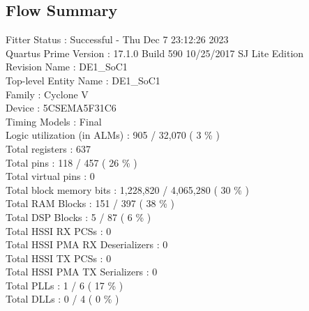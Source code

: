 \documentclass[11pt, titlepage]{article}
\begin{document}
        \subsection{Flow Summary}
            Fitter Status : Successful - Thu Dec  7 23:12:26 2023 \\
            Quartus Prime Version : 17.1.0 Build 590 10/25/2017 SJ Lite Edition \\
            Revision Name : DE1\_SoC1 \\
            Top-level Entity Name : DE1\_SoC1 \\
            Family : Cyclone V \\
            Device : 5CSEMA5F31C6 \\
            Timing Models : Final \\
            Logic utilization (in ALMs) : 905 / 32,070 ( 3 \% ) \\
            Total registers : 637 \\
            Total pins : 118 / 457 ( 26 \% ) \\
            Total virtual pins : 0 \\
            Total block memory bits : 1,228,820 / 4,065,280 ( 30 \% ) \\
            Total RAM Blocks : 151 / 397 ( 38 \% ) \\
            Total DSP Blocks : 5 / 87 ( 6 \% ) \\
            Total HSSI RX PCSs : 0 \\
            Total HSSI PMA RX Deserializers : 0 \\
            Total HSSI TX PCSs : 0 \\
            Total HSSI PMA TX Serializers : 0 \\
            Total PLLs : 1 / 6 ( 17 \% ) \\
            Total DLLs : 0 / 4 ( 0 \% ) \\
\end{document}
